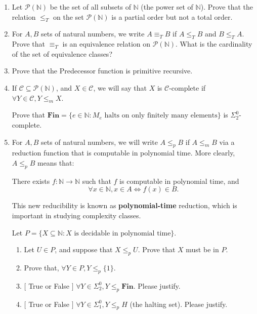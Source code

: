\documentclass[11pt]{article}
\begin{document}
\begin{enumerate}[{\bf Q1.}]
\vspace{1cm}

For the next two questions, familiarize yourself with the following concepts: 

Partial Order Relations, Total Order Relations, Equivalence Relations, and Equivalence Classes of an equivalence relation. 

\item Let  $\mathcal{P}(\mathbb{N})$ be the set of all subsets of $\mathbb{N}$ (the power set of $\mathbb{N}$). Prove that the relation $\leq_T$ on the set $\mathcal{P}(\mathbb{N})$ is a partial order but not a total order. 

\item For $A,B$ sets of natural numbers, we write $A\equiv_T B$ if $A\leq_T B$ and $B\leq_T A$. Prove that $\equiv_T$ is an equivalence relation on $\mathcal{P}(\mathbb{N})$. What is the cardinality of the set of equivalence classes?



\newpage

\item Prove that the Predecessor function is primitive recursive.


\item
If $\mathcal{C}\subseteq \mathcal{P}(\mathbb{N})$, and $X\in\mathcal{C}$, we will say that $X$ is $\mathcal{C}$-complete if $\forall Y\in\mathcal{C}, Y\leq_m X.$

Prove that $\textbf{Fin}=\{ e  \in\mathbb{N}  \colon M_e \text{ halts on only finitely many elements}\}$ is $\Sigma^0_2$-complete. 

 

\item  For $A,B$ sets of natural numbers, we will write $A\leq_p B$ if $A\leq_m B$ via a reduction function that is computable in polynomial time. More clearly, $A\leq_p B$ means that:

There exists $f\colon \mathbb{N}\to\mathbb{N}$ such that $f$ is computable in polynomial time, and $$\forall x\in\mathbb{N}, x\in A\Leftrightarrow f(x)\in B.$$

This new reducibility is known as \textbf{polynomial-time} reduction, which is important in studying complexity classes. 

Let $P = \{X\subseteq\mathbb{N}\colon X \text{ is decidable in polynomial time}\}$. 

\begin{enumerate}
    \item Let $U\in P$, and suppose that $X\leq_p U$. Prove that $X$ must be in $P$.
    \item Prove that, $\forall Y\in P, Y\leq_p \{1\}$.  
    \item $[$ True or False $]$ $\forall Y\in \Sigma^0_2, Y\leq_p \textbf{Fin}.$ Please justify.
    \item $[$ True or False $]$ $\forall Y\in \Sigma^0_1, Y\leq_p H$ (the halting set). Please justify.
\end{enumerate}



\end{enumerate}
\end{document}
